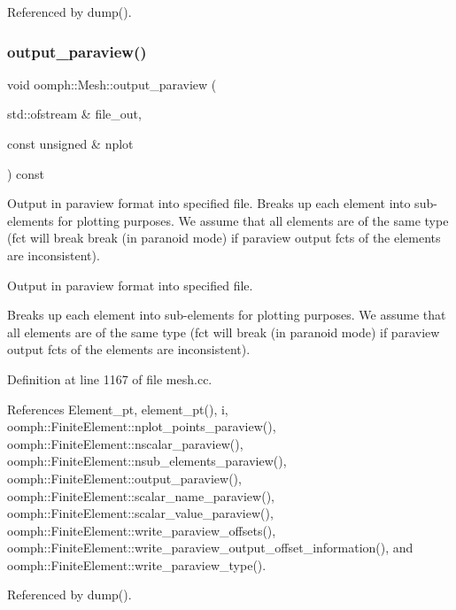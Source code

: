 Referenced by dump().

\mbox{\label{classoomph_1_1Mesh_af62d80c53dc07390d8f62ed180ab6d3a}} 
\subsubsection{\texorpdfstring{output\+\_\+paraview()}{output\_paraview()}}
{\footnotesize\ttfamily void oomph\+::\+Mesh\+::output\+\_\+paraview (\begin{DoxyParamCaption}\item[{std\+::ofstream \&}]{file\+\_\+out,  }\item[{const unsigned \&}]{nplot }\end{DoxyParamCaption}) const}



Output in paraview format into specified file. Breaks up each element into sub-\/elements for plotting purposes. We assume that all elements are of the same type (fct will break break (in paranoid mode) if paraview output fcts of the elements are inconsistent). 

Output in paraview format into specified file.

Breaks up each element into sub-\/elements for plotting purposes. We assume that all elements are of the same type (fct will break (in paranoid mode) if paraview output fcts of the elements are inconsistent). 

Definition at line 1167 of file mesh.\+cc.



References Element\+\_\+pt, element\+\_\+pt(), i, oomph\+::\+Finite\+Element\+::nplot\+\_\+points\+\_\+paraview(), oomph\+::\+Finite\+Element\+::nscalar\+\_\+paraview(), oomph\+::\+Finite\+Element\+::nsub\+\_\+elements\+\_\+paraview(), oomph\+::\+Finite\+Element\+::output\+\_\+paraview(), oomph\+::\+Finite\+Element\+::scalar\+\_\+name\+\_\+paraview(), oomph\+::\+Finite\+Element\+::scalar\+\_\+value\+\_\+paraview(), oomph\+::\+Finite\+Element\+::write\+\_\+paraview\+\_\+offsets(), oomph\+::\+Finite\+Element\+::write\+\_\+paraview\+\_\+output\+\_\+offset\+\_\+information(), and oomph\+::\+Finite\+Element\+::write\+\_\+paraview\+\_\+type().



Referenced by dump().

